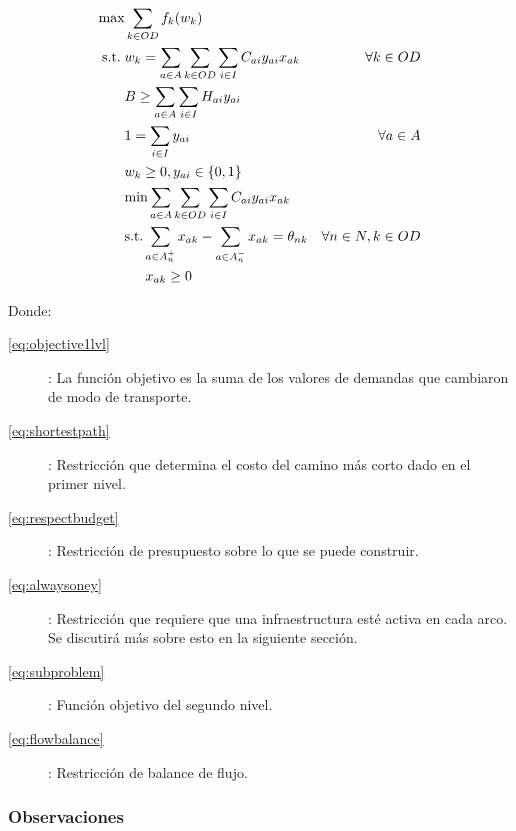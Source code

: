 \documentclass{article}
\newcommand{\modelspace}{\hspace{1.5em}}
\begin{document}
  \begin{align}
    \text{max}    & \sum_{k \in OD} f_k(w_k)                                                         & \label{eq:objective1lvl} \\
    \text{s.t.}\; & w_k = \sum_{a \in A} \sum_{k \in OD} \sum_{i \in I} C_{ai}y_{ai}x_{ak}           & \forall k \in OD \label{eq:shortestpath} \\
                  & B \geq \sum_{a \in A} \sum_{i \in I} H_{ai}y_{ai}                                & \label{eq:respectbudget} \\
                  & 1 = \sum_{i \in I} y_{ai}                                                        & \forall a \in A \label{eq:alwaysoney} \\
                  & w_k \geq 0, y_{ai} \in \{0,1\}                                                   & \nonumber \\
                  & \text{min} \sum_{a \in A} \sum_{k \in OD} \sum_{i \in I} C_{ai}y_{ai}x_{ak}      & \label{eq:subproblem} \\
                  & \text{s.t.} \sum_{a \in A_n^+} x_{ak} - \sum_{a \in A_n^-} x_{ak} = \theta_{nk}  & \forall n \in N, k \in OD \label {eq:flowbalance} \\
                  & \modelspace x_{ak} \geq 0                                                        & \nonumber
  \end{align}

  Donde:

  \begin{description}
    \item[\ref{eq:objective1lvl}]: La función objetivo es la suma de los valores de demandas que cambiaron de modo de transporte.
    \item[\ref{eq:shortestpath}]: Restricción que determina el costo del camino más corto dado en el primer nivel.
    \item[\ref{eq:respectbudget}]: Restricción de presupuesto sobre lo que se puede construir.
    \item[\ref{eq:alwaysoney}]: Restricción que requiere que una infraestructura esté activa en cada arco. Se discutirá más sobre esto en la siguiente sección.
    \item[\ref{eq:subproblem}]: Función objetivo del segundo nivel.
    \item[\ref{eq:flowbalance}]: Restricción de balance de flujo.
  \end{description}

  \subsubsection*{Observaciones}
\end{document}
